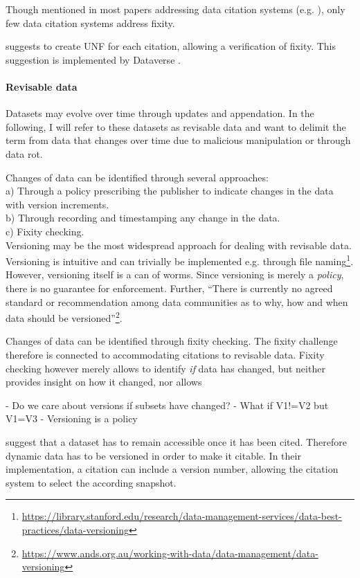 \documentclass[a4paper,10pt]{article}
\begin{document}
Though mentioned in most papers addressing data citation systems (e.g. \citep{Buneman2016, Davidson2017}), only few data citation systems address fixity.

\citep{AltKin07} suggests to create \gls{UNF} for each citation, allowing a verification of fixity. This suggestion is implemented by Dataverse \citep{Crosas2011}.


\paragraph{Revisable data}
Datasets may evolve over time through updates and appendation. In the following, I will refer to these datasets as revisable data and want to delimit the term from data that changes over time due to malicious manipulation or through data rot.

Changes of data can be identified through several approaches: \\
a) Through a policy prescribing the publisher to indicate changes in the data with version increments. \\
b) Through recording and timestamping any change in the data. \\
c) Fixity checking. \\

Versioning may be the most widespread approach for dealing with revisable data. Versioning is intuitive and can trivially be implemented e.g. through file naming\footnote{\url{https://library.stanford.edu/research/data-management-services/data-best-practices/data-versioning}}.
However, versioning itself is a can of worms. Since versioning is merely a \textit{policy}, there is no guarantee for enforcement. Further, ``There is currently no agreed standard or recommendation among data communities as to why, how and when data should be versioned''\footnote{\url{https://www.ands.org.au/working-with-data/data-management/data-versioning}}.



Changes of data can be identified through fixity checking. The fixity challenge therefore is connected to accommodating citations to revisable data. 
Fixity checking however merely allows to identify \textit{if} data has changed, but neither provides insight on how it changed, nor allows 


- Do we care about versions if subsets have changed?
- What if V1!=V2 but V1=V3
- Versioning is a policy 


\citep{Buneman2010} suggest that a dataset has to remain accessible once it has been cited. Therefore dynamic data has to be versioned in order to make it citable.
In their implementation, a citation can include a version number, allowing the citation system to select the according snapshot.
\end{document}
